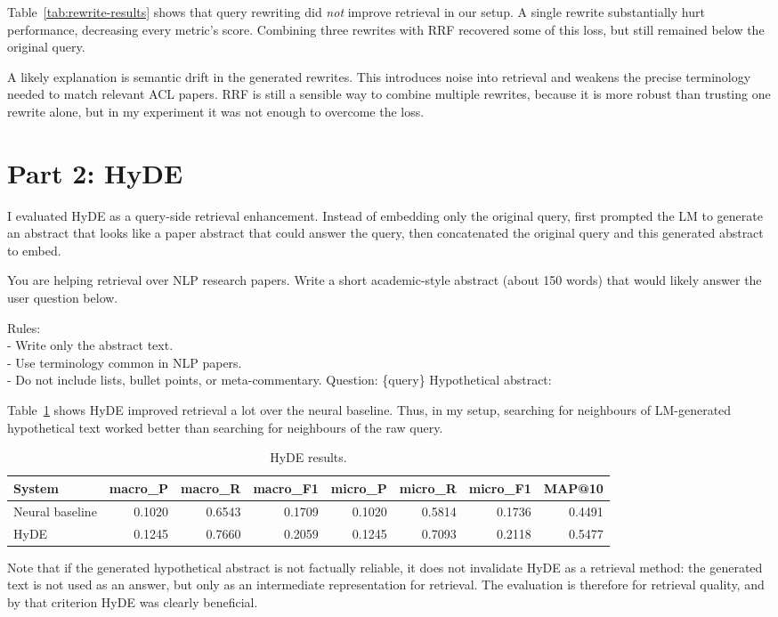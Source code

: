 \documentclass[a4paper,11pt]{article}
\begin{document}
Table~\ref{tab:rewrite-results} shows that query rewriting did \emph{not} improve retrieval in our setup. A single rewrite substantially hurt performance,
  decreasing every metric's score. Combining three rewrites with RRF recovered some of this loss, but still remained below the original query.

  A likely explanation is semantic drift in the generated rewrites. This introduces noise into retrieval and weakens the precise terminology needed to match relevant ACL papers. RRF is still a sensible way to combine multiple rewrites, because it is more robust than trusting one rewrite alone, but in my experiment it was not enough to overcome the loss.
\newpage
\section*{Part 2: HyDE}

I evaluated HyDE as a query-side retrieval enhancement. Instead of embedding only the original query, first prompted the LM to generate an abstract that looks like a paper abstract that could answer the query, then concatenated the original query and this generated abstract to embed.

  \begin{tcolorbox}[title=HyDE Prompt, fontupper=\raggedright, breakable]
  \ttfamily
  You are helping retrieval over NLP research papers. Write a short academic-style abstract
  (about 150 words) that would likely answer the user question below.

  Rules: \\
  - Write only the abstract text. \\
  - Use terminology common in NLP papers. \\
  - Do not include lists, bullet points, or meta-commentary.
  Question: \{query\}
  Hypothetical abstract:
  \end{tcolorbox}
 
   Table~\ref{tab:hyde-results} shows HyDE improved retrieval a lot over the neural baseline. Thus, in my setup, searching for neighbours of LM-generated hypothetical text worked better than searching for neighbours of the raw query.

  \begin{table}[t]
  \centering
  \begin{tabular}{lrrrrrrr}
  \toprule
  System & macro\_P & macro\_R & macro\_F1 & micro\_P & micro\_R & micro\_F1 & MAP@10 \\
  \midrule
  Neural baseline & 0.1020 & 0.6543 & 0.1709 & 0.1020 & 0.5814 & 0.1736 & 0.4491 \\
  HyDE & 0.1245 & 0.7660 & 0.2059 & 0.1245 & 0.7093 & 0.2118 & 0.5477 \\
  \bottomrule
  \end{tabular}
  \caption{HyDE results.}
  \label{tab:hyde-results}
  \end{table}
  Note that if the generated hypothetical abstract is not factually reliable, it does not invalidate HyDE as a retrieval method: the generated text is not used as an answer, but only as an intermediate representation for retrieval. The evaluation is therefore for retrieval quality, and by that criterion HyDE was clearly beneficial.
\newpage
\end{document}
